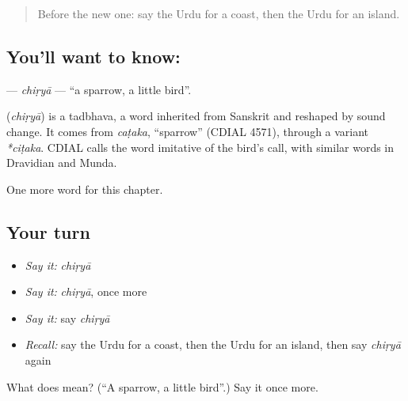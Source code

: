 \label{lesson:UR-C125-chirya}



\begin{quote}
Before the new one: say the Urdu for a coast, then the Urdu for an island.
\end{quote}

\subsection*{You'll want to know: }
\textbf{} — \emph{chiṛyā} — \textquotedblleft{}a sparrow, a little bird\textquotedblright{}.

\begin{cousinweb}
\textbf{} (\emph{chiṛyā}) is a tadbhava, a word inherited from Sanskrit and reshaped by sound change. It comes from \emph{caṭaka}, \textquotedblleft{}sparrow\textquotedblright{} (CDIAL 4571), through a variant \emph{*ciṭaka}. CDIAL calls the word imitative of the bird's call, with similar words in Dravidian and Munda.
\end{cousinweb}

\begin{grammarlens}[title={What you've built}]
One more word for this chapter.
\end{grammarlens}

\subsection*{Your turn}
\begin{itemize}
\raggedright
  \item \emph{Say it:} \emph{chiṛyā}
  \item \emph{Say it:} \emph{chiṛyā}, once more
  \item \emph{Say it:} say \emph{chiṛyā}
  \item \emph{Recall:} say the Urdu for a coast, then the Urdu for an island, then say \emph{chiṛyā} again
\end{itemize}

\begin{tcolorbox}[breakable,colback=teal!4,colframe=teal!35!black,title={Before you move on}]
What does  mean? (\textquotedblleft{}A sparrow, a little bird\textquotedblright{}.) Say it once more.
\end{tcolorbox}
